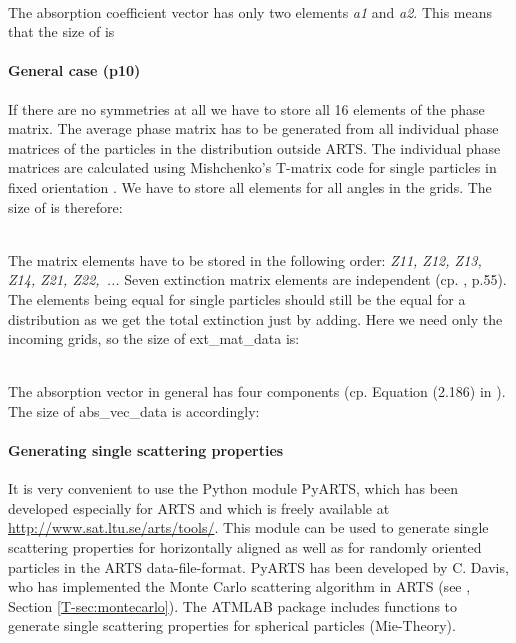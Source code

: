 \artsstyle{[N\_f N\_T N\_za/2+1 1 3]}\\
The absorption coefficient vector has only two elements {\sl a1} and
{\sl a2}. This means that the size of  is 

\artsstyle{[N\_f N\_T N\_za/2+1 1 2]}

\paragraph{General case (p10)}

If there are no symmetries at all we have to store all 16 elements of
the phase matrix. The average phase matrix has to be generated from
all individual phase matrices of the particles in the distribution
outside ARTS. The individual phase matrices are calculated using
Mishchenko's T-matrix code for single particles in fixed orientation
\citep{Mishchenko:00}. 
We have to store all elements for all angles in the grids. The size of
 is therefore: 

\\
The matrix elements have to be stored in the following order: {\sl Z11,
  Z12, Z13, Z14, Z21, Z22,~...} Seven extinction matrix elements are
independent (cp. \citet{Mishchenko:02}, p.55). The elements being equal for
single particles should still be the equal for a distribution as we
get the total extinction just by adding. Here we need only the
incoming grids, so the size of ext\_mat\_data is: 

\\
The absorption vector in general has four components (cp. Equation
(2.186) in \citet{Mishchenko:02}). The size of abs\_vec\_data is
accordingly: 


\paragraph{Generating single scattering properties}
It is very convenient to use the Python module PyARTS, which has been
developed especially for ARTS and which is freely available at
\href{http://www.sat.ltu.se/arts/tools/}
{\url{http://www.sat.ltu.se/arts/tools/}}. This
module can be used to generate single scattering properties for
horizontally aligned as well as for randomly oriented particles in the
ARTS data-file-format. PyARTS has been developed by C. Davis, who has
implemented the Monte Carlo scattering algorithm in ARTS (see
\theory, Section \ref{T-sec:montecarlo}).
The ATMLAB package includes functions to generate single scattering
properties for spherical particles (Mie-Theory). 


